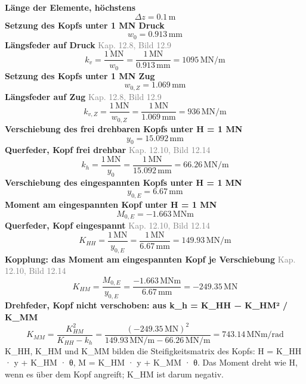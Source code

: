 \documentclass[11pt,a4paper]{article}
\newcommand{\normref}[1]{{\small\textcolor{gray}{#1}}}
\begin{document}
\noindent\textbf{Länge der Elemente, höchstens}
\begin{equation*}
\Delta z = 0.1\,\mathrm{m}
\end{equation*}
\noindent\textbf{Setzung des Kopfs unter 1 MN Druck}
\begin{equation*}
w_0 = 0.913\,\mathrm{mm}
\end{equation*}
\noindent\textbf{Längsfeder auf Druck} \hfill \normref{Kap. 12.8, Bild 12.9}
\begin{equation*}
k_v = \frac{1\,\mathrm{MN}}{w_0} = \frac{1\,\mathrm{MN}}{0.913\,\mathrm{mm}} = 1095\,\mathrm{MN}/\mathrm{m}
\end{equation*}
\noindent\textbf{Setzung des Kopfs unter 1 MN Zug}
\begin{equation*}
w_{0,Z} = 1.069\,\mathrm{mm}
\end{equation*}
\noindent\textbf{Längsfeder auf Zug} \hfill \normref{Kap. 12.8, Bild 12.9}
\begin{equation*}
k_{v,Z} = \frac{1\,\mathrm{MN}}{w_{0,Z}} = \frac{1\,\mathrm{MN}}{1.069\,\mathrm{mm}} = 936\,\mathrm{MN}/\mathrm{m}
\end{equation*}
\noindent\textbf{Verschiebung des frei drehbaren Kopfs unter H = 1 MN}
\begin{equation*}
y_0 = 15.092\,\mathrm{mm}
\end{equation*}
\noindent\textbf{Querfeder, Kopf frei drehbar} \hfill \normref{Kap. 12.10, Bild 12.14}
\begin{equation*}
k_h = \frac{1\,\mathrm{MN}}{y_0} = \frac{1\,\mathrm{MN}}{15.092\,\mathrm{mm}} = 66.26\,\mathrm{MN}/\mathrm{m}
\end{equation*}
\noindent\textbf{Verschiebung des eingespannten Kopfs unter H = 1 MN}
\begin{equation*}
y_{0,E} = 6.67\,\mathrm{mm}
\end{equation*}
\noindent\textbf{Moment am eingespannten Kopf unter H = 1 MN}
\begin{equation*}
M_{0,E} = -1.663\,\mathrm{MNm}
\end{equation*}
\noindent\textbf{Querfeder, Kopf eingespannt} \hfill \normref{Kap. 12.10, Bild 12.14}
\begin{equation*}
K_{HH} = \frac{1\,\mathrm{MN}}{y_{0,E}} = \frac{1\,\mathrm{MN}}{6.67\,\mathrm{mm}} = 149.93\,\mathrm{MN}/\mathrm{m}
\end{equation*}
\noindent\textbf{Kopplung: das Moment am eingespannten Kopf je Verschiebung} \hfill \normref{Kap. 12.10, Bild 12.14}
\begin{equation*}
K_{HM} = \frac{M_{0,E}}{y_{0,E}} = \frac{-1.663\,\mathrm{MNm}}{6.67\,\mathrm{mm}} = -249.35\,\mathrm{MN}
\end{equation*}
\noindent\textbf{Drehfeder, Kopf nicht verschoben: aus k\_h = K\_HH − K\_HM² / K\_MM}
\begin{equation*}
K_{MM} = \frac{K_{HM}^{2}}{K_{HH} - k_h} = \frac{\left(-249.35\,\mathrm{MN}\right)^{2}}{149.93\,\mathrm{MN}/\mathrm{m} - 66.26\,\mathrm{MN}/\mathrm{m}} = 743.14\,\mathrm{MNm}/\mathrm{rad}
\end{equation*}
K\_HH, K\_HM und K\_MM bilden die Steifigkeitsmatrix des Kopfs: H = K\_HH · y + K\_HM · θ, M = K\_HM · y + K\_MM · θ. Das Moment dreht wie H, wenn es über dem Kopf angreift; K\_HM ist darum negativ.
\end{document}
